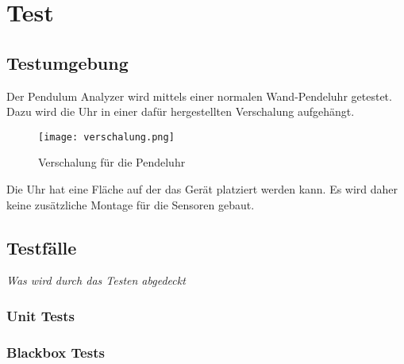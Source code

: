 \section{Test}
		\subsection{Testumgebung}
        Der Pendulum Analyzer wird mittels einer normalen Wand-Pendeluhr getestet. Dazu wird die Uhr in einer dafür hergestellten Verschalung aufgehängt.
        \begin{figure}[H]
            \centering
            \texttt{[image: verschalung.png]}
            \caption{Verschalung für die Pendeluhr}
        \end{figure}

        \noindent Die Uhr hat eine Fläche auf der das Gerät platziert werden kann. Es wird daher keine zusätzliche Montage für die Sensoren gebaut.
		\subsection{Testfälle}
			\textit{Was wird durch das Testen abgedeckt}
			\subsubsection{Unit Tests}
			\subsubsection{Blackbox Tests}